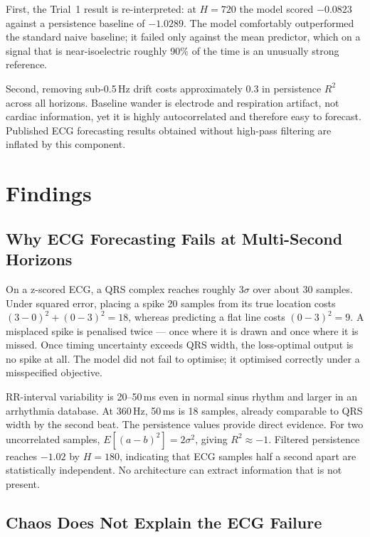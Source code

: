 \documentclass[11pt,a4paper]{article}
\begin{document}
First, the Trial~1 result is re-interpreted: at $H = 720$ the model scored $-0.0823$ against a persistence baseline of $-1.0289$.
The model comfortably outperformed the standard naive baseline; it failed only against the mean predictor, which on a signal that is near-isoelectric roughly 90\% of the time is an unusually strong reference.

Second, removing sub-0.5\,Hz drift costs approximately 0.3 in persistence $R^2$ across all horizons.
Baseline wander is electrode and respiration artifact, not cardiac information, yet it is highly autocorrelated and therefore easy to forecast.
Published ECG forecasting results obtained without high-pass filtering are inflated by this component.


\section{Findings}

\subsection{Why ECG Forecasting Fails at Multi-Second Horizons}

On a z-scored ECG, a QRS complex reaches roughly $3\sigma$ over about 30 samples.
Under squared error, placing a spike 20 samples from its true location costs $(3-0)^2 + (0-3)^2 = 18$, whereas predicting a flat line costs $(0-3)^2 = 9$.
A misplaced spike is penalised twice --- once where it is drawn and once where it is missed.
Once timing uncertainty exceeds QRS width, the loss-optimal output is no spike at all.
The model did not fail to optimise; it optimised correctly under a misspecified objective.

RR-interval variability is 20--50\,ms even in normal sinus rhythm and larger in an arrhythmia database.
At 360\,Hz, 50\,ms is 18 samples, already comparable to QRS width by the second beat.
The persistence values provide direct evidence.
For two uncorrelated samples, $E[(a-b)^2] = 2\sigma^2$, giving $R^2 \approx -1$.
Filtered persistence reaches $-1.02$ by $H = 180$, indicating that ECG samples half a second apart are statistically independent.
No architecture can extract information that is not present.

\subsection{Chaos Does Not Explain the ECG Failure}
\end{document}
